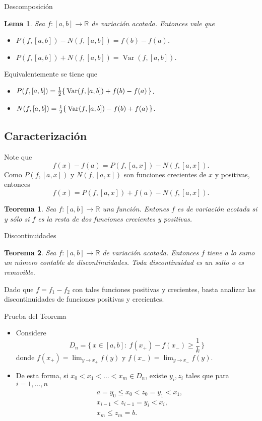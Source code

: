 \documentclass[utf8]{beamer}
\theoremstyle{plain}
\newtheorem{Th}{Teorema}               %
\newtheorem{Lem}{Lema}                 %
\theoremstyle{definition}
\theoremstyle{remark}
\numberwithin{equation}{section}
\newcommand{\bR}{\mathbb{R}}    %
\newcommand{\set}[1]{\{\,#1\,\}}    %
\newcommand{\Set}[1]{\biggl\{\,#1\,\biggr\}} %
\renewcommand{\geq}{\geqslant}          %
\renewcommand{\leq}{\leqslant}          %
\newcommand{\half}{{\mathchoice{\nhalf}{\thalf}{\shalf}{\shalf}}} %
\newcommand{\nhalf}{\frac{1}{2}}
\newcommand{\shalf}{{\scriptstyle\frac{1}{2}}} %
\newcommand{\thalf}{{\tfrac{1}{2}}} %
\renewcommand{\.}{\Cdot}                %
\DeclareMathOperator{\Var}{Var}     %
\begin{document}
\begin{frame}{Descomposición}
  \begin{Lem}\label{lem:descompVarPN}
    Sea $f:[a,b]\to\bR$ de variación acotada. Entonces vale que
    \begin{itemize}
      \item $P(f,[a,b])-N(f,[a,b])=f(b)-f(a)$.
      \item $P(f,[a,b])+N(f,[a,b])=\Var(f,[a,b])$.
    \end{itemize}
  \end{Lem}
Equivalentemente se tiene que 
\begin{itemize}
  \item $P(f,[a,b])=\half\set{\Var(f,[a,b])+f(b)-f(a)}$.
  \item $N(f,[a,b])=\half\set{\Var(f,[a,b])-f(b)+f(a)}$.
\end{itemize}
\end{frame}

\subsection{Caracterización}

\begin{frame}
  Note que 
  $$f(x)-f(a)=P(f,[a,x])-N(f,[a,x]).$$
  Como $P(f,[a,x])$ y $N(f,[a,x])$ son funciones crecientes de $x$ y positivas, entonces 
  $$f(x)=P(f,[a,x])+f(a)-N(f,[a,x]).$$
  \begin{Th}\label{thm:caracVA}
  Sea $f:[a,b]\to\bR$ una función. Entones $f$ es de variación acotada si y sólo si $f$ es la resta de dos funciones crecientes y positivas.
  \end{Th}
\end{frame}

\begin{frame}{Discontinuidades}
  \begin{Th}\label{thm:contablesDiscont}
    Sea $f:[a,b]\to\bR$ de variación acotada. Entonces $f$ tiene a lo sumo un número contable de discontinuidades. Toda discontinuidad es un salto o es removible. 
  \end{Th}
  Dado que $f=f_1-f_2$ con tales funciones positivas y crecientes, basta analizar las discontinuidades de funciones positivas y crecientes.
\end{frame}

\begin{frame}{Prueba del Teorema}
  \begin{itemize}
    \item Considere 
    $$D_n=\Set{x\in[a,b]:\ f(x_+)-f(x_-)\geq\frac1k}$$
    donde $f(x_+)=\lim_{y\to x_+}f(y)$ y $f(x_-)=\lim_{y\to x_-}f(y)$.
    \item De esta forma, si $x_0<x_1<\dots< x_m\in D_n$, existe $y_i,z_i$ tales que para $i=1,\dots,n$
    \begin{align*}
      &a=y_0\leq x_0<z_0=y_1<x_1,\\
      &x_{i-1}<z_{i-1}=y_i<x_i,\\
      &x_m\leq z_m=b.
    \end{align*}
  \end{itemize}
\end{frame}
\end{document}
